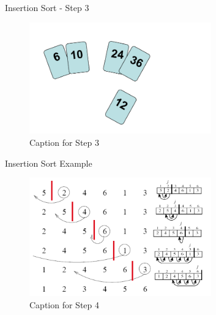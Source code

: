 \begin{frame}{Insertion Sort - Step 3}
    \begin{figure}
        \includegraphics[width=0.7\textwidth]{assets/ins3.png}
        \caption{Caption for Step 3}
    \end{figure}
\end{frame}

\begin{frame}{Insertion Sort Example}
    \begin{figure}
        \includegraphics[width=0.7\textwidth]{assets/ins4.png}
        \caption{Caption for Step 4}
    \end{figure}
\end{frame}

